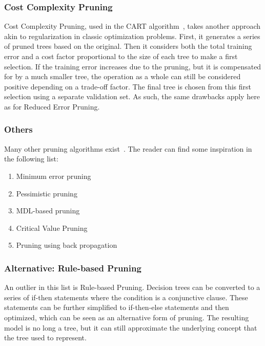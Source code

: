 \subsubsection{Cost Complexity Pruning}
Cost Complexity Pruning, used in the CART algorithm~\cite{cart}, takes another approach akin to regularization in classic optimization problems. First, it generates a series of pruned trees based on the original. Then it considers both the total training error and a cost factor proportional to the size of each tree to make a first selection. If the training error increases due to the pruning, but it is compensated for by a much smaller tree, the operation as a whole can still be considered positive depending on a trade-off factor. The final tree is chosen from this first selection using a separate validation set. As such, the same drawbacks apply here as for Reduced Error Pruning.

\subsubsection{Others}
Many other pruning algorithms exist~\cite{mingers1989empirical, breslow1997simplifying, elomaa1999biases, esposito1997comparative}. The reader can find some inspiration in the following list:

\begin{enumerate}
    \item Minimum error pruning~\cite{niblett1986learning}
    \item Pessimistic pruning~\cite{mansour1997pessimistic, quinlan1987simplifying, c45}
    \item MDL-based pruning~\cite{mdlpruning, quinlan1989inferring}
    \item Critical Value Pruning~\cite{mingers1987rule}
    \item Pruning using back propagation~\cite{backproppruning}
\end{enumerate}

\subsubsection{Alternative: Rule-based Pruning}
An outlier in this list is Rule-based Pruning. Decision trees can be converted to a series of if-then statements where the condition is a conjunctive clause. These statements can be further simplified to if-then-else statements and then optimized, which can be seen as an alternative form of pruning. The resulting model is no long a tree, but it can still approximate the underlying concept that the tree used to represent.

